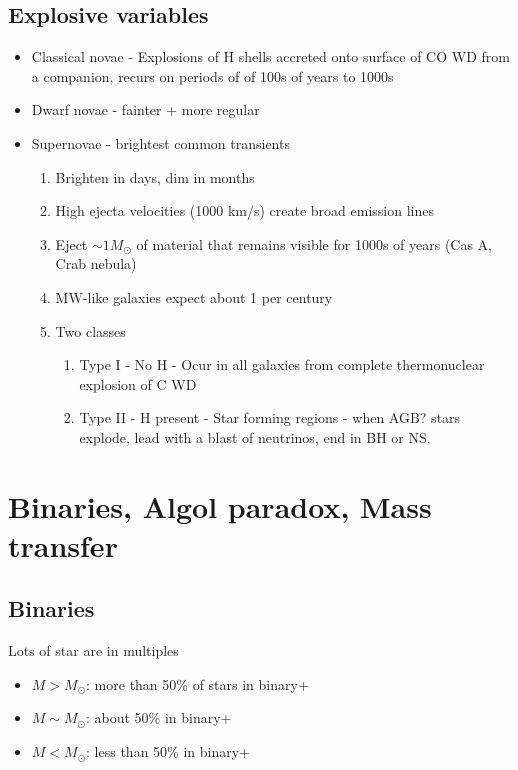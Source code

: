 \documentclass{article}
\begin{document}
\subsection{Explosive variables}
\begin{itemize}
    \item Classical novae - Explosions of H shells accreted onto surface of CO WD from a companion, recurs on periods of of 100s of years to 1000s

    \item Dwarf novae - fainter + more regular

    \item Supernovae - brightest common transients
    \begin{enumerate}
        \item Brighten in days, dim in months

        \item High ejecta velocities (1000 km/s) create broad emission lines

        \item Eject $\sim 1 M_\odot$ of material that remains visible for 1000s of years (Cas A, Crab nebula)

        \item MW-like galaxies expect about 1 per century

        \item Two classes
        \begin{enumerate}
            \item Type I - No H - Ocur in all galaxies from complete thermonuclear explosion of C WD

            \item Type II - H present - Star forming regions - when AGB? stars explode, lead with a blast of neutrinos, end in BH or NS.
        \end{enumerate}
    \end{enumerate}
\end{itemize}

\section{Binaries, Algol paradox, Mass transfer}

\subsection{Binaries}

Lots of star are in multiples
\begin{itemize}
    \item $M > M_\odot$: more than 50\% of stars in binary+
    \item $M \sim M_\odot$: about 50\% in binary+
    \item $M < M_\odot$: less than 50\% in binary+
\end{itemize}
\end{document}
